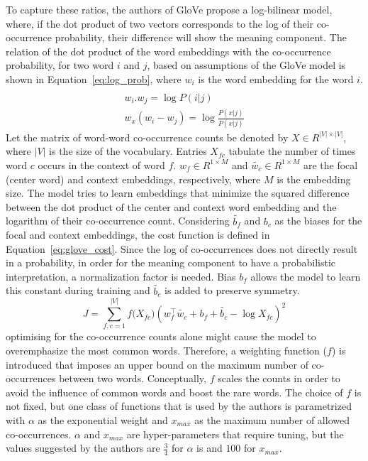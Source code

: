 \noindent
To capture these ratios, the authors of GloVe propose a log-bilinear model, where, if the dot product of two vectors corresponds to the log of their co-occurrence probability, their difference will show the meaning component. The relation of the dot product of the word embeddings with the co-occurrence probability, for two word $i$ and $j$, based on assumptions of the GloVe model is shown in Equation~\ref{eq:log_prob}, where $w_i$ is the word embedding for the word $i$. 
\begin{equation}
\begin{split}
\\ w_{ i }.w_{ j }=\log { P(i|j)\quad  } \\
w_{ x }(w_{ i }-w_{ j })=\log { \frac { P(x|j) }{ P(x|j) } } 
\end{split}
\end{equation}
Let the matrix of word-word co-occurrence counts be denoted by $X\in { R }^{ |V|\times |V| }$, where $|V|$ is the size of the vocabulary.  Entries $X_{fc}$ tabulate the number of times word $c$ occurs in the context of word $f$. $w_{ f }\in { R }^{ 1\times M }$ and $\tilde{w_{ c }}\in { R }^{ 1\times M }$ are the focal (center word) and context embeddings, respectively, where $M$ is the embedding size. The model tries to learn embeddings that minimize the squared difference between the dot product of the center and context word embedding and the logarithm of their co-occurrence count.
Considering $ \tilde{b_{ f }}$ and $b_{ c }$  as the biases for the focal and context embeddings, the cost function is defined in Equation~\ref{eq:glove_cost}. Since the log of co-occurrences does not directly result in a probability, in order for the meaning component to have a probabilistic interpretation, a normalization factor is needed. Bias $b_{ f }$ allows the model to learn this constant during training and $ \tilde{b_{ c }}$ is added to preserve symmetry. 
\begin{equation}
J=\sum _{ f,c=1 }^{ |V| }{ f({ X }_{ fc } } )(w_{ f }^{ \top }\tilde{  w_{ c } } +b_{ f }+\tilde{  b_{ c } } -\log{ X }_{ fc })^2
\label{eq:glove_cost}
\end{equation}
optimising for the co-occurrence counts alone might cause the model to overemphasize the most common words. Therefore, a weighting function ($f$) is introduced that imposes an upper bound on the maximum number of co-occurrences between two words. Conceptually, $f$ scales the counts in order to avoid the influence of common words and boost the rare words. The choice of $f$ is not fixed, but one class of functions that is used by the authors is parametrized with $\alpha$ as the exponential weight and $x_{max}$ as the maximum number of allowed co-occurrences. $\alpha$ and $x_{max}$ are hyper-parameters that require tuning, but the values suggested by the authors are $\frac{3}{4}$ for $\alpha$ is  and $100$ for $x_{max}$. 
